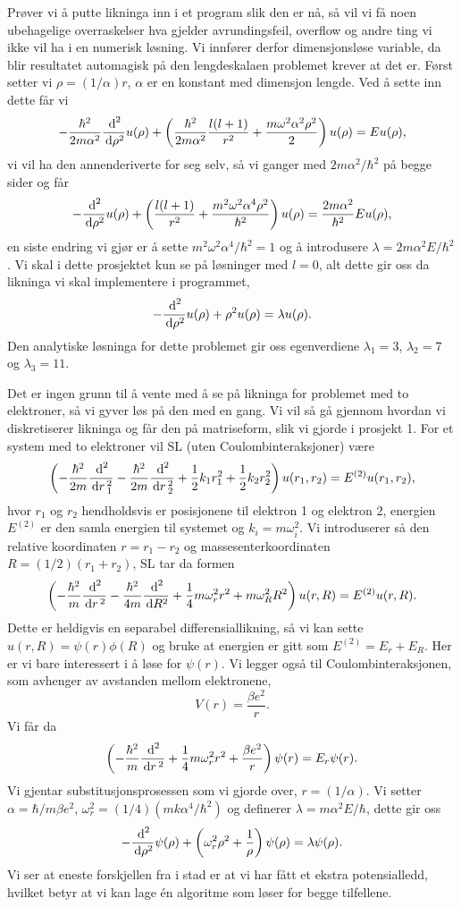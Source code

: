 \documentclass[norsk, 12pt]{article}
\theoremstyle{definition} \newtheorem{defi}{Definisjon}[subsection]
\theoremstyle{definition} \newtheorem{teo}{Teorem}[subsection]
\theoremstyle{definition} \newtheorem*{eks}{Eksempel}
\newcommand{\dr}{\, {\rm d}r\, }
\newcommand{\dd}{\, {\text d} }
\def\para#1{\left( #1 \right)}
\begin{document}
Prøver vi å putte likninga inn i et program slik den er nå, så vil vi få noen ubehagelige overraskelser hva gjelder avrundingsfeil, overflow og andre ting vi ikke vil ha i en numerisk løsning. Vi innfører derfor dimensjonsløse variable, da blir resultatet automagisk på den lengdeskalaen problemet krever at det er. Først setter vi $ \rho = (1/ \alpha)r$, $\alpha$ er en konstant med dimensjon lengde. Ved å sette inn dette får vi
$$ -\frac{\hbar^2}{2m\alpha^2}\frac{\dd^2}{\dd\rho^2}u(\rho) + \para{\frac{\hbar^2}{2m\alpha^2}\frac{l(l+1)}{r^2} + \frac{m\omega^2\alpha^2\rho^2}{2}} u(\rho) = E u(\rho), $$
vi vil ha den annenderiverte for seg selv, så vi ganger med $2m\alpha^2/\hbar^2$ på begge sider og får
$$ -\frac{\dd^2}{\dd\rho^2}u(\rho) + \para{\frac{l(l+1)}{r^2} + \frac{m^2\omega^2\alpha^4\rho^2}{\hbar^2}} u(\rho) = \frac{2m\alpha^2}{\hbar^2}E u(\rho), $$
en siste endring vi gjør er å sette $m^2\omega^2\alpha^4/\hbar^2=1$ og å introdusere $ \lambda = 2m\alpha^2 E/ \hbar^2$. Vi skal i dette prosjektet kun se på løsninger med $l=0$, alt dette gir oss da likninga vi skal implementere i programmet,
$$ -\frac{\dd^2}{\dd\rho^2}u(\rho) + \rho^2u(\rho) = \lambda u(\rho). $$
Den analytiske løsninga for dette problemet gir oss egenverdiene $\lambda_1 = 3$, $\lambda_2 = 7$ og $\lambda_3 = 11$.

Det er ingen grunn til å vente med å se på likninga for problemet med to elektroner, så vi gyver løs på den med en gang. Vi vil så gå gjennom hvordan vi diskretiserer likninga og får den på matriseform, slik vi gjorde i prosjekt 1. For et system med to elektroner vil SL (uten Coulombinteraksjoner) være
\[ \para{- \frac{ \hbar^2}{2m} \frac{\dd^2}{\dr_1^2} - \frac{ \hbar^2}{2m} \frac{\dd^2}{\dr_2^2} + \frac{1}2 k_1r_1^2 + \frac{1}2 k_2r_2^2} u(r_1,r_2) = E^{(2)}u(r_1,r_2), \]
hvor $r_1$ og $r_2$ hendholdsvis er posisjonene til elektron 1 og elektron 2, energien $E^{(2)}$ er den samla energien til systemet og $k_i = m\omega_i^2$. Vi introduserer så den relative koordinaten $r = r_1 - r_2$ og massesenterkoordinaten $R = (1/2)(r_1 + r_2)$, SL tar da formen
$$ \para{- \frac{ \hbar^2}{m} \frac{\dd^2}{\dr^2} - \frac{ \hbar^2}{4m} \frac{\dd^2}{\dd R^2} + \frac{1}4 m\omega_r^2r^2 + m\omega_R^2R^2} u(r,R) = E^{(2)}u(r,R). $$
Dette er heldigvis en separabel differensiallikning, så vi kan sette $u(r,R) = \psi(r)\phi(R)$  og bruke at energien er gitt som $E^{(2)} = E_r + E_R$. Her er vi bare interessert i å løse for $\psi(r)$. Vi legger også til Coulombinteraksjonen, som avhenger av avstanden mellom elektronene,
$$ V(r) = \frac{\beta e^2}r. $$ 
Vi får da
$$ \para{- \frac{ \hbar^2}{m} \frac{\dd^2}{\dr^2} + \frac{1}4 m\omega_r^2r^2 + \frac{\beta e^2}r} \psi(r) = E_r\psi(r). $$
Vi gjentar substitusjonsprosessen som vi gjorde over, $r = (1/\alpha)$. Vi setter $\alpha  = \hbar / m\beta e^2$, $\omega_r^2 = (1/4)(mk\alpha^4/\hbar^2)$ og definerer $ \lambda = m \alpha^2 E/\hbar$, dette gir oss
$$ - \frac{\dd^2}{\dd \rho^2} \psi(\rho) + \para{\omega_r^2\rho^2 + \frac{1}\rho} \psi(\rho) = \lambda \psi(\rho). $$
Vi ser at eneste forskjellen fra i stad er at vi har fått et ekstra potensialledd, hvilket betyr at vi kan lage én algoritme som løser for begge tilfellene.
\end{document}
